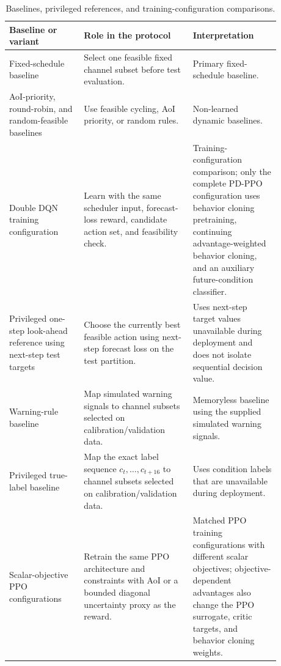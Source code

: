 \begin{table}[htbp]
  \centering
  \caption{Baselines, privileged references, and training-configuration comparisons.}
  \label{tab:baseline_reference_taxonomy}
  \footnotesize
  \setlength{\tabcolsep}{3.2pt}
  \renewcommand{\arraystretch}{0.96}
  \begin{tabular}{@{}>{\raggedright\arraybackslash}p{0.24\linewidth}>{\raggedright\arraybackslash}p{0.35\linewidth}>{\raggedright\arraybackslash}p{0.29\linewidth}@{}}
    \toprule
    Baseline or variant & Role in the protocol & Interpretation \\
    \midrule
    Fixed-schedule baseline
      & Select one feasible fixed channel subset before test evaluation.
      & Primary fixed-schedule baseline. \\
    AoI-priority, round-robin, and random-feasible baselines
      & Use feasible cycling, AoI priority, or random rules.
      & Non-learned dynamic baselines. \\
    Double DQN training configuration
      & Learn with the same scheduler input, forecast-loss reward, candidate action set, and feasibility check.
      & Training-configuration comparison; only the complete PD-PPO configuration uses behavior cloning pretraining, continuing advantage-weighted behavior cloning, and an auxiliary future-condition classifier. \\
    Privileged one-step look-ahead reference using next-step test targets
      & Choose the currently best feasible action using next-step forecast loss on the test partition.
      & Uses next-step target values unavailable during deployment and does not isolate sequential decision value. \\
    Warning-rule baseline
      & Map simulated warning signals to channel subsets selected on calibration/validation data.
      & Memoryless baseline using the supplied simulated warning signals. \\
    Privileged true-label baseline
      & Map the exact label sequence $c_t,\ldots,c_{t+16}$ to channel subsets
        selected on calibration/validation data.
      & Uses condition labels that are unavailable during deployment. \\
    Scalar-objective PPO configurations
      & Retrain the same PPO architecture and constraints with AoI or a bounded diagonal uncertainty proxy as the reward.
      & Matched PPO training configurations with different scalar objectives; objective-dependent advantages also change the PPO surrogate, critic targets, and behavior cloning weights. \\
    \bottomrule
  \end{tabular}
\end{table}
